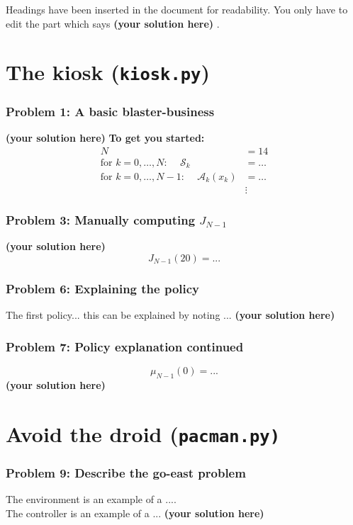 \documentclass[12pt,twoside]{article}
\newcommand\redt[1]{ {\textcolor[rgb]{0.60, 0.00, 0.00}{\textbf{ #1} } } }
\newcommand{\yoursolution}{ \redt{(your solution here) } }
\begin{document}

Headings have been inserted in the document for readability. You only have to edit the part which says \yoursolution. 

\section{The kiosk (\texttt{kiosk.py})}
\subsubsection*{{\color{red}Problem 1:  A basic blaster-business}}

\yoursolution 	
\redt{To get you started: \begin{align}
	N & = 14 \\
	\mbox{for $k=0,\dots,N$: }\quad	\mathcal{S}_k & = \dots \\
	\mbox{for $k=0,\dots,N-1$: }\quad \mathcal{A}_k(x_k) & = \dots \\
	 & \vdots 
\end{align} }

\subsubsection*{{\color{red}Problem 3:  Manually computing $J_{N-1}$}}
		
	\yoursolution 	
	$$
	J_{N-1}(20)  = ...
	$$
	
\subsubsection*{{\color{red}Problem 6:  Explaining the policy}}

					The first policy... this can be explained by noting ... \yoursolution 

\subsubsection*{{\color{red}Problem 7:  Policy explanation continued}}
	
	$$\mu_{N-1}(0) = ...$$
\yoursolution 		

\section{Avoid the droid (\texttt{pacman.py)}} 
\subsubsection*{{\color{red}Problem 9:  Describe the go-east problem}}
	
		The environment is an example of a .... \\		
		The controller is an example of a ...
		\yoursolution 	
	
\end{document}
